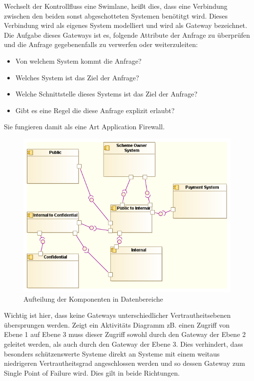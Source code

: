 Wechselt der Kontrollfluss eine Swimlane, heißt dies, dass eine Verbindung zwischen den beiden sonst abgeschotteten Systemen benötitgt wird. Dieses Verbindung wird als eigenes System modelliert und wird als Gateway bezeichnet. Die Aufgabe dieses Gateways ist es, folgende Attribute der Anfrage zu überprüfen und die Anfrage gegebenenfalls zu verwerfen oder weiterzuleiten:

\begin{itemize}
  \item Von welchem System kommt die Anfrage?
  \item Welches System ist das Ziel der Anfrage?
  \item Welche Schnittstelle dieses Systems ist das Ziel der Anfrage?
  \item Gibt es eine Regel die diese Anfrage explizit erlaubt?
\end{itemize}

Sie fungieren damit als eine Art Application Firewall.

\begin{figure}[H]
    \centering
    \includegraphics[scale=0.7]{uml/dataarch.png}
    \caption{Aufteilung der Komponenten in Datenbereiche}
\end{figure}

Wichtig ist hier, dass keine Gateways unterschiedlicher Vertrautheitsebenen übersprungen werden. Zeigt ein Aktivitäts Diagramm zB. einen Zugriff von Ebene 1 auf Ebene 3 muss dieser Zugriff sowohl durch den Gateway der Ebene 2 geleitet werden, als auch durch den Gateway der Ebene 3. Dies verhindert, dass besonders schützenswerte Systeme direkt an Systeme mit einem weitaus niedrigeren Vertrautheitsgrad angeschlossen werden und so dessen Gateway zum Single Point of Failure wird. Dies gilt in beide Richtungen.

